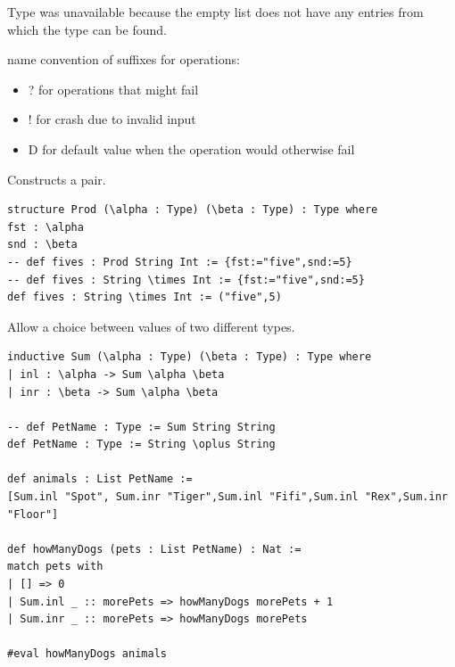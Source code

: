 \documentclass{article}
\begin{document}
\begin{remark}
    Type was unavailable because the empty list does not have any entries from which the type can be found.
\end{remark}

name convention of suffixes for operations:
\begin{itemize}
    \item ? for operations that might fail
    \item ! for crash due to invalid input
    \item D for default value when the operation would otherwise fail
\end{itemize}

\begin{definition}[Prod]
    Constructs a pair.
    \begin{verbatim}
structure Prod (\alpha : Type) (\beta : Type) : Type where
fst : \alpha
snd : \beta
-- def fives : Prod String Int := {fst:="five",snd:=5}
-- def fives : String \times Int := {fst:="five",snd:=5}
def fives : String \times Int := ("five",5)
\end{verbatim}
\end{definition}

\begin{definition}[Sum]
    Allow a choice between values of two different types.
    \begin{verbatim}
inductive Sum (\alpha : Type) (\beta : Type) : Type where
| inl : \alpha -> Sum \alpha \beta
| inr : \beta -> Sum \alpha \beta

-- def PetName : Type := Sum String String
def PetName : Type := String \oplus String

def animals : List PetName :=
[Sum.inl "Spot", Sum.inr "Tiger",Sum.inl "Fifi",Sum.inl "Rex",Sum.inr "Floor"]

def howManyDogs (pets : List PetName) : Nat :=
match pets with
| [] => 0
| Sum.inl _ :: morePets => howManyDogs morePets + 1
| Sum.inr _ :: morePets => howManyDogs morePets

#eval howManyDogs animals
\end{verbatim}
\end{definition}

\begin{definition}[Unit]

\end{definition}

\begin{definition}[Empty]

\end{definition}
\end{document}

